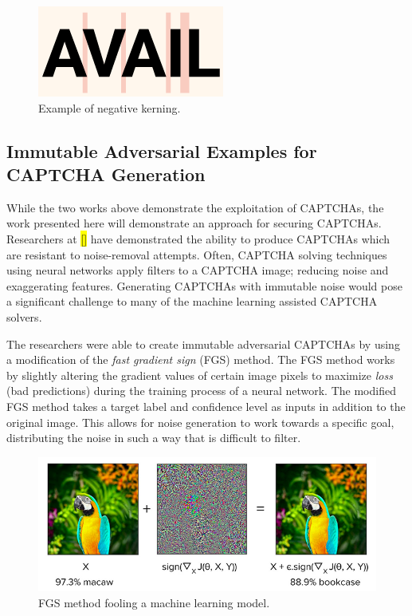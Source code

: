 \documentclass[11pt,conference]{IEEEtran}
\begin{document}
\begin{figure}[htbp]
	\centerline{\includegraphics[scale=0.5]{images/negative-kerning.png}}
	\caption{Example of negative kerning.}
	\label{figure}
\end{figure}

\subsection{Immutable Adversarial Examples for CAPTCHA Generation}
While the two works above demonstrate the exploitation of CAPTCHAs, the work
presented here will demonstrate an approach for securing CAPTCHAs. Researchers
at \hl{[]} have demonstrated the ability to produce CAPTCHAs which are resistant to
noise-removal attempts. Often, CAPTCHA solving techniques using neural networks
apply filters to a CAPTCHA image; reducing noise and exaggerating features. Generating CAPTCHAs with immutable noise would pose a significant
challenge to many of the machine learning assisted CAPTCHA solvers.

The researchers were able to create immutable adversarial CAPTCHAs by using a
modification of the \emph{fast gradient sign} (FGS) method. The FGS method
works by slightly altering the gradient values of certain image pixels to
maximize \emph{loss} (bad predictions) during the training process of a neural network. The
modified FGS method takes a target label and confidence level as inputs in
addition to the original image. This allows for noise generation to work
towards a specific goal, distributing the noise in such a way that is
difficult to filter.

\begin{figure}[htbp]
	\centerline{\includegraphics[scale=0.35]{images/fgsm_technique.png}}
	\caption{FGS method fooling a machine learning model.}
	\label{figure}
\end{figure}
\end{document}
